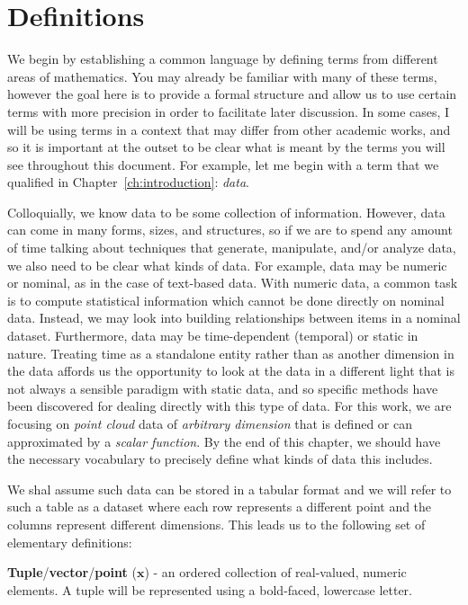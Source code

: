 
\chapter{Definitions}
\label{ch:definitions}

We begin by establishing a common language by defining terms from different areas of mathematics.
%
You may already be familiar with many of these terms, however the goal here is to provide a formal structure and allow us to use certain terms with more precision in order to facilitate later discussion.
%
In some cases, I will be using terms in a context that may differ from other academic works, and so it is important at the outset to be clear what is meant by the terms you will see throughout this document.
%
For example, let me begin with a term that we qualified in Chapter~\ref{ch:introduction}: \emph{data}.

Colloquially, we know data to be some collection of information.
%
However, data can come in many forms, sizes, and structures, so if we are to spend any amount of time talking about techniques that generate, manipulate, and/or analyze data, we also need to be clear what kinds of data.
%
For example, data may be numeric or nominal, as in the case of text-based data.
%
With numeric data, a common task is to compute statistical information which cannot be done directly on nominal data.
%
Instead, we may look into building relationships between items in a nominal dataset.
%
Furthermore, data may be time-dependent (temporal) or static in nature.
%
Treating time as a standalone entity rather than as another dimension in the data affords us the opportunity to look at the data in a different light that is not always a sensible paradigm with static data, and so specific methods have been discovered for dealing directly with this type of data.
%
For this work, we are focusing on \emph{point cloud} data of \emph{arbitrary dimension} that is defined or can approximated by a \emph{scalar function}.
%
By the end of this chapter, we should have the necessary vocabulary to precisely define what kinds of data this includes.

We shal assume such data can be stored in a tabular format and we will refer to such a table as a dataset where each row represents a different point and the columns represent different dimensions. This leads us to the following set of elementary definitions:

\begin{defn}
  \textbf{Tuple}/\textbf{vector}/\textbf{point} ($\mathbf{x}$) - an ordered collection of real-valued, numeric elements. A tuple will be represented using a bold-faced, lowercase letter.
\end{defn}

